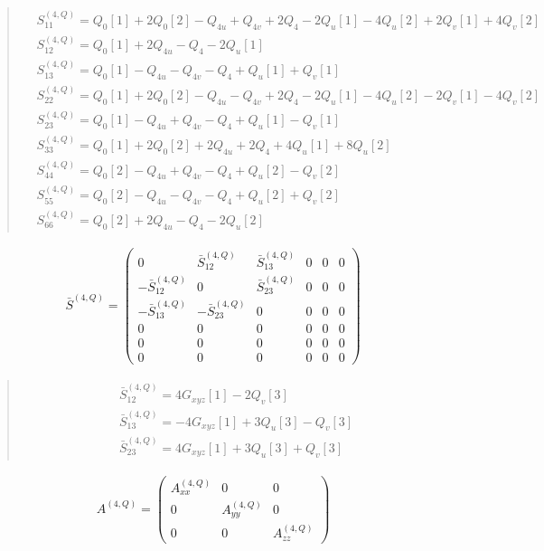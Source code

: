 \documentclass[fleqn,10pt]{jsarticle}
\begin{document}
\begin{quote}
\begin{align*}
& S^{(4,Q)}_{11} = Q_{0}[1] + 2 Q_{0}[2] - Q_{4u} + Q_{4v} + 2 Q_{4} - 2 Q_{u}[1] - 4 Q_{u}[2] + 2 Q_{v}[1] + 4 Q_{v}[2] \\
& S^{(4,Q)}_{12} = Q_{0}[1] + 2 Q_{4u} - Q_{4} - 2 Q_{u}[1] \\
& S^{(4,Q)}_{13} = Q_{0}[1] - Q_{4u} - Q_{4v} - Q_{4} + Q_{u}[1] + Q_{v}[1] \\
& S^{(4,Q)}_{22} = Q_{0}[1] + 2 Q_{0}[2] - Q_{4u} - Q_{4v} + 2 Q_{4} - 2 Q_{u}[1] - 4 Q_{u}[2] - 2 Q_{v}[1] - 4 Q_{v}[2] \\
& S^{(4,Q)}_{23} = Q_{0}[1] - Q_{4u} + Q_{4v} - Q_{4} + Q_{u}[1] - Q_{v}[1] \\
& S^{(4,Q)}_{33} = Q_{0}[1] + 2 Q_{0}[2] + 2 Q_{4u} + 2 Q_{4} + 4 Q_{u}[1] + 8 Q_{u}[2] \\
& S^{(4,Q)}_{44} = Q_{0}[2] - Q_{4u} + Q_{4v} - Q_{4} + Q_{u}[2] - Q_{v}[2] \\
& S^{(4,Q)}_{55} = Q_{0}[2] - Q_{4u} - Q_{4v} - Q_{4} + Q_{u}[2] + Q_{v}[2] \\
& S^{(4,Q)}_{66} = Q_{0}[2] + 2 Q_{4u} - Q_{4} - 2 Q_{u}[2]
\end{align*}
\end{quote}
\begin{align*}
\bar{S}^{(4,Q)} = \begin{pmatrix} 0 & \bar{S}^{(4,Q)}_{12} & \bar{S}^{(4,Q)}_{13} & 0 & 0 & 0 \\ - \bar{S}^{(4,Q)}_{12} & 0 & \bar{S}^{(4,Q)}_{23} & 0 & 0 & 0 \\ - \bar{S}^{(4,Q)}_{13} & - \bar{S}^{(4,Q)}_{23} & 0 & 0 & 0 & 0 \\ 0 & 0 & 0 & 0 & 0 & 0 \\ 0 & 0 & 0 & 0 & 0 & 0 \\ 0 & 0 & 0 & 0 & 0 & 0 \end{pmatrix}
\end{align*}
\begin{quote}
\begin{align*}
& \bar{S}^{(4,Q)}_{12} = 4 G_{xyz}[1] - 2 Q_{v}[3] \\
& \bar{S}^{(4,Q)}_{13} = - 4 G_{xyz}[1] + 3 Q_{u}[3] - Q_{v}[3] \\
& \bar{S}^{(4,Q)}_{23} = 4 G_{xyz}[1] + 3 Q_{u}[3] + Q_{v}[3]
\end{align*}
\end{quote}
\begin{align*}
A^{(4,Q)} = \begin{pmatrix} A^{(4,Q)}_{xx} & 0 & 0 \\ 0 & A^{(4,Q)}_{yy} & 0 \\ 0 & 0 & A^{(4,Q)}_{zz} \end{pmatrix}
\end{align*}
\end{document}
